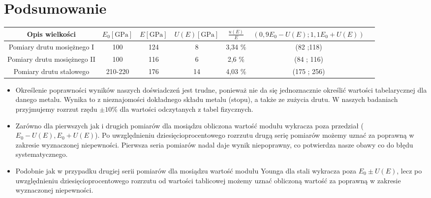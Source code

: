 \documentclass [a4paper,11pt]{article}
\begin{document}
	
	
	\section{Podsumowanie}
	\begin{center}
		\begin{tabular}{|c|c|c|c|c|c|c|}
			\hline Opis wielkości & $ E_0 \left[ \text{GPa} \right]$ & $E \left[ \text{GPa} \right]$ & $U(E) \left[ \text{GPa} \right]$ & $ \frac{u(E)}{E} $& $(0,9E_0-U(E); 1,1E_0 + U(E))$\\
			\hline Pomiary drutu mosiężnego I & 100 & 124 & 8 & 3,34 \% & (82 ;118) \\
			\hline Pomiary drutu mosiężnego II & 100 & 116 & 6 & 2,6 \% & (84 ; 116) \\  
			\hline Pomiary drutu stalowego & 210-220 & 176  & 14 &  4,03 \% & (175 ; 256)\\ 
			\hline 
		\end{tabular} 
	\end{center}
\vspace{1em}

\begin{itemize}
	\item Określenie poprawności wyników naszych doświadczeń jest trudne, ponieważ nie da się jednoznacznie określić wartości tabelarycznej dla danego metalu. Wynika to z nieznajomości dokładnego składu metalu (stopu), a także ze zużycia drutu. W naszych badaniach przyjmujemy rozrzut rzędu $\pm10\%$ dla wartości odczytanych z tabel fizycznych.
	
	\item Zarówno dla pierwszych jak i drugich pomiarów dla mosiądzu obliczona wartość modułu wykracza poza przedział ($E_0-U(E), E_0+U(E)$). Po uwzględnieniu dziesięcioprocentowego rozrzutu drugą serię pomiarów możemy uznać za poprawną w zakresie wyznaczonej niepewności. Pierwsza seria pomiarów nadal daje wynik niepoprawny, co potwierdza nasze obawy co do błędu systematycznego.
	
	\item Podobnie jak w przypadku drugiej serii pomiarów dla mosiądzu wartość modułu Younga dla stali wykracza poza $E_0 \pm U(E)$, lecz po uwzględnieniu dziesięcioprocentowego rozrzutu od wartości tablicowej możemy uznać obliczoną wartość za poprawną w zakresie wyznaczonej niepewności.
	
\end{itemize}
\end{document}
